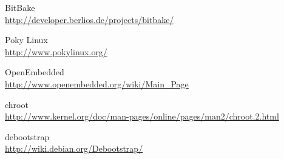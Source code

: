 \documentclass[a4paper,11pt,openany]{report}
\begin{document}
\begin{thebibliography}{ZZ}
BitBake\\
\url{http://developer.berlios.de/projects/bitbake/}

Poky Linux\\
\url{http://www.pokylinux.org/}

OpenEmbedded\\
\url{http://www.openembedded.org/wiki/Main_Page}

chroot\\
\url{http://www.kernel.org/doc/man-pages/online/pages/man2/chroot.2.html}

debootstrap\\
\url{http://wiki.debian.org/Debootstrap/}

\end{thebibliography}
\end{document}
